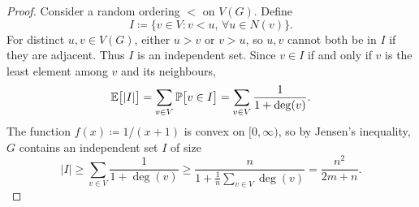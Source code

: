 \begin{proof}
  Consider a random ordering $<$ on $V(G)$. Define 
  \[
    I \coloneqq \bigl\{v \in V : v < u, \, \forall u \in N(v)\bigr\}.
  \]
  For distinct $u, v \in V(G)$, either $u > v$ or $v > u$, so $u, v$ cannot both be in $I$ if they are adjacent. Thus $I$ is an independent set. Since $v \in I$ if and only if $v$ is the least element among $v$ and its neighbours, 
  \[
    \mathbb{E}\bigl[|I|\bigr] = \sum_{v \in V} \mathbb{P}\bigl[v \in I\bigr] = \sum_{v \in V} \frac{1}{1 + \operatorname{deg}(v)}.
  \]
  The function $f(x) \coloneqq 1/(x + 1)$ is convex on $[0, \infty)$, so by Jensen's inequality, $G$ contains an independent set $I$ of size 
  \[
    |I| \geq \sum_{v \in V} \frac{1}{1 + \deg(v)} \geq \frac{n}{1 + \frac{1}{n}\sum_{v \in V} \deg(v)} = \frac{n^2}{2m + n}.
  \]
\end{proof}